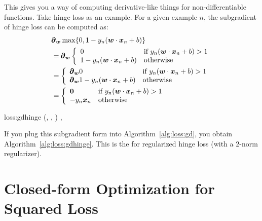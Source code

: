 This gives you a way of computing derivative-like things for
non-differentiable functions.  Take hinge loss as an example.  For a
given example $n$, the subgradient of hinge loss can be computed as:
%
\begin{align}
&\pmb\partial_{\boldsymbol{w}} \max \{ 0, 1 - y_n ( {\boldsymbol{w}} \cdot {\boldsymbol{x}}_n+b ) \} \\
&= \pmb\partial_{\boldsymbol{w}} \left\{\begin{array}{ll} 0 & \text{if } y_n ( {\boldsymbol{w}} \cdot {\boldsymbol{x}}_n+b ) > 1 \\
                        1 - y_n ( {\boldsymbol{w}} \cdot {\boldsymbol{x}}_n+b )  & \text{otherwise}\end{array}\right.\\
&= \left\{\begin{array}{ll} \pmb\partial_{\boldsymbol{w}} 0 & \text{if } y_n ( {\boldsymbol{w}} \cdot {\boldsymbol{x}}_n+b ) > 1 \\
           \pmb\partial_{\boldsymbol{w}} 1 - y_n ( {\boldsymbol{w}} \cdot {\boldsymbol{x}}_n+b )  & \text{otherwise}\end{array}\right.\\
&= \left\{\begin{array}{ll} \boldsymbol{0} & \text{if } y_n ( {\boldsymbol{w}} \cdot {\boldsymbol{x}}_n+b ) > 1 \\
           - y_n {\boldsymbol{x}}_n  & \text{otherwise}\end{array}\right.
\end{align}

\newalgorithm%
  {loss:gdhinge}%
  {(, \VAR{$\la$}, )}
  {
\ENDIF
\ENDFOR
\SETST{$\vg$}{$\VARm{\vg} - \VARm{\la} \VARm{\vw}$}
\SETST{$\vw$}{$\VARm{\vw} + \VARm{\eta} \VARm{\vg}$}
\ENDFOR
\RETURN \VAR{$\vw$}, 
}

If you plug this subgradient form into Algorithm~\ref{alg:loss:gd},
you obtain Algorithm~\ref{alg:loss:gdhinge}.  This is the
 for regularized hinge loss (with a
$2$-norm regularizer).


\section{Closed-form Optimization for Squared Loss}
\label{sec:loss:reg}

